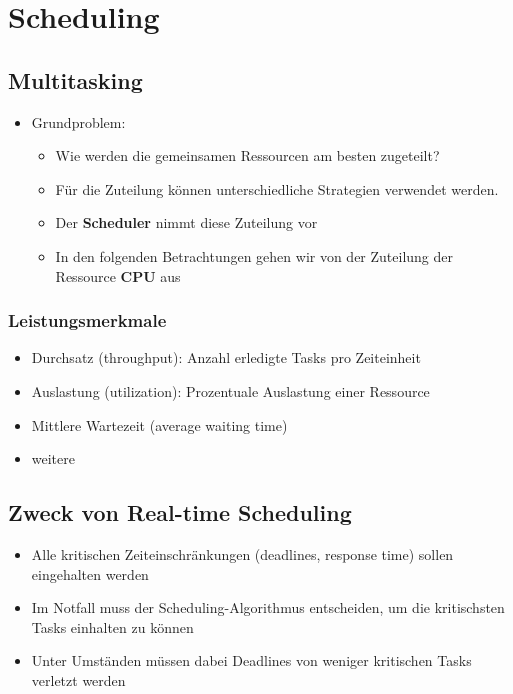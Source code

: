 \section{Scheduling}

\subsection{Multitasking}
\begin{itemize}
  \item Grundproblem:
  \begin{itemize}
    \item Wie werden die gemeinsamen Ressourcen am besten zugeteilt?
    \item Für die Zuteilung können unterschiedliche Strategien verwendet werden.
    \item Der \textbf{Scheduler} nimmt diese Zuteilung vor
    \item In den folgenden Betrachtungen gehen wir von der Zuteilung der Ressource \textbf{CPU} aus
  \end{itemize}
\end{itemize}

\subsubsection{Leistungsmerkmale}
\begin{itemize}
  \item Durchsatz (throughput): Anzahl erledigte Tasks pro Zeiteinheit
  \item Auslastung (utilization): Prozentuale Auslastung einer Ressource
  \item Mittlere Wartezeit (average waiting time)
  \item weitere
\end{itemize}

\subsection{Zweck von Real-time Scheduling}
\begin{itemize}
  \item Alle kritischen Zeiteinschränkungen (deadlines, response time) sollen eingehalten werden
  \item Im Notfall muss der Scheduling-Algorithmus entscheiden, um die kritischsten Tasks einhalten zu können
  \item Unter Umständen müssen dabei Deadlines von weniger kritischen Tasks verletzt werden
\end{itemize}

